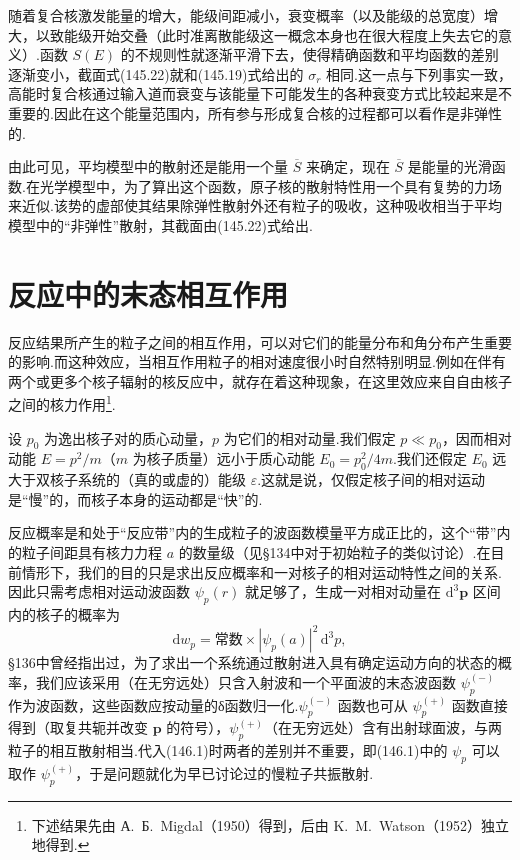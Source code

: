 随着复合核激发能量的增大，能级间距减小，衰变概率（以及能级的总宽度）增大，以致能级开始交叠（此时准离散能级这一概念本身也在很大程度上失去它的意义）.函数 $S(E)$ 的不规则性就逐渐平滑下去，使得精确函数和平均函数的差别逐渐变小，截面式(145.22)就和(145.19)式给出的 $\sigma_r$ 相同.这一点与下列事实一致，高能时复合核通过输入道而衰变与该能量下可能发生的各种衰变方式比较起来是不重要的.因此在这个能量范围内，所有参与形成复合核的过程都可以看作是非弹性的.

由此可见，平均模型中的散射还是能用一个量 $\overline{S}$ 来确定，现在 $\overline{S}$ 是能量的光滑函数.在光学模型中，为了算出这个函数，原子核的散射特性用一个具有复势的力场来近似.该势的虚部使其结果除弹性散射外还有粒子的吸收，这种吸收相当于平均模型中的“非弹性”散射，其截面由(145.22)式给出.

\section{反应中的末态相互作用}

反应结果所产生的粒子之间的相互作用，可以对它们的能量分布和角分布产生重要的影响.而这种效应，当相互作用粒子的相对速度很小时自然特别明显.例如在伴有两个或更多个核子辐射的核反应中，就存在着这种现象，在这里效应来自自由核子之间的核力作用\footnote{下述结果先由 А.~Б.~Migdal（1950）得到，后由 K.~M.~Watson（1952）独立地得到.}.

设 $p_0$ 为逸出核子对的质心动量，$p$ 为它们的相对动量.我们假定 $p\ll p_0$，因而相对动能 $E=p^2/m$（$m$ 为核子质量）远小于质心动能 $E_0=p_0^2/4m$.我们还假定 $E_0$ 远大于双核子系统的（真的或虚的）能级 $\varepsilon$.这就是说，仅假定核子间的相对运动是“慢”的，而核子本身的运动都是“快”的.

反应概率是和处于“反应带”内的生成粒子的波函数模量平方成正比的，这个“带”内的粒子间距具有核力力程 $a$ 的数量级（见§134中对于初始粒子的类似讨论）.在目前情形下，我们的目的只是求出反应概率和一对核子的相对运动特性之间的关系.因此只需考虑相对运动波函数 $\psi_p(r)$ 就足够了，生成一对相对动量在 $\mathrm{d}^3\boldsymbol{p}$ 区间内的核子的概率为
\begin{equation}
  \mathrm{d}w_p=\text{常数}\times|\psi_p(a)|^2\,\mathrm{d}^3p,
\end{equation}
§136中曾经指出过，为了求出一个系统通过散射进入具有确定运动方向的状态的概率，我们应该采用（在无穷远处）只含入射波和一个平面波的末态波函数 $\psi_p^{(-)}$ 作为波函数，这些函数应按动量的δ函数归一化.$\psi_p^{(-)}$ 函数也可从 $\psi_p^{(+)}$ 函数直接得到（取复共轭并改变 $\boldsymbol{p}$ 的符号），$\psi_p^{(+)}$（在无穷远处）含有出射球面波，与两粒子的相互散射相当.代入(146.1)时两者的差别并不重要，即(146.1)中的 $\psi_p$ 可以取作 $\psi_p^{(+)}$，于是问题就化为早已讨论过的慢粒子共振散射.

